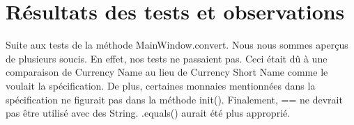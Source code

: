 \documentclass[letterpaper, 10pt]{article}
\begin{document}
\section*{Résultats des tests et observations}
Suite aux tests de la méthode MainWindow.convert. Nous nous sommes aperçus de plusieurs soucis. En effet, nos tests ne passaient pas. Ceci était dû à une comparaison de Currency Name au lieu de Currency Short Name comme le voulait la spécification. De plus, certaines monnaies mentionnées dans la spécification ne figurait pas dans la méthode init(). Finalement, == ne devrait pas être utilisé avec des String. .equals() aurait été plus approprié.\\\\
\end{document}
